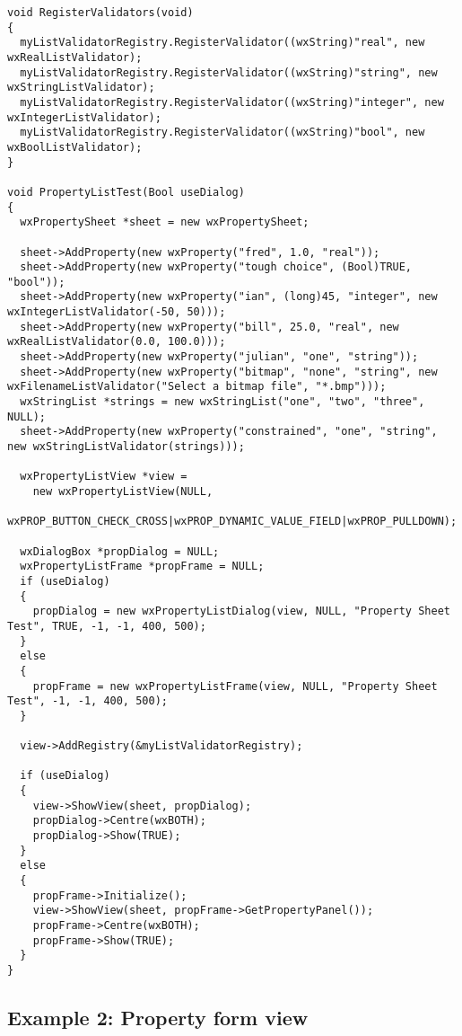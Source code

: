 \begin{verbatim}
void RegisterValidators(void)
{
  myListValidatorRegistry.RegisterValidator((wxString)"real", new wxRealListValidator);
  myListValidatorRegistry.RegisterValidator((wxString)"string", new wxStringListValidator);
  myListValidatorRegistry.RegisterValidator((wxString)"integer", new wxIntegerListValidator);
  myListValidatorRegistry.RegisterValidator((wxString)"bool", new wxBoolListValidator);
}

void PropertyListTest(Bool useDialog)
{
  wxPropertySheet *sheet = new wxPropertySheet;

  sheet->AddProperty(new wxProperty("fred", 1.0, "real"));
  sheet->AddProperty(new wxProperty("tough choice", (Bool)TRUE, "bool"));
  sheet->AddProperty(new wxProperty("ian", (long)45, "integer", new wxIntegerListValidator(-50, 50)));
  sheet->AddProperty(new wxProperty("bill", 25.0, "real", new wxRealListValidator(0.0, 100.0)));
  sheet->AddProperty(new wxProperty("julian", "one", "string"));
  sheet->AddProperty(new wxProperty("bitmap", "none", "string", new wxFilenameListValidator("Select a bitmap file", "*.bmp")));
  wxStringList *strings = new wxStringList("one", "two", "three", NULL);
  sheet->AddProperty(new wxProperty("constrained", "one", "string", new wxStringListValidator(strings)));

  wxPropertyListView *view =
    new wxPropertyListView(NULL,
     wxPROP_BUTTON_CHECK_CROSS|wxPROP_DYNAMIC_VALUE_FIELD|wxPROP_PULLDOWN);

  wxDialogBox *propDialog = NULL;
  wxPropertyListFrame *propFrame = NULL;
  if (useDialog)
  {
    propDialog = new wxPropertyListDialog(view, NULL, "Property Sheet Test", TRUE, -1, -1, 400, 500);
  }
  else
  {
    propFrame = new wxPropertyListFrame(view, NULL, "Property Sheet Test", -1, -1, 400, 500);
  }
  
  view->AddRegistry(&myListValidatorRegistry);

  if (useDialog)
  {
    view->ShowView(sheet, propDialog);
    propDialog->Centre(wxBOTH);
    propDialog->Show(TRUE);
  }
  else
  {
    propFrame->Initialize();
    view->ShowView(sheet, propFrame->GetPropertyPanel());
    propFrame->Centre(wxBOTH);
    propFrame->Show(TRUE);
  }
}
\end{verbatim}

\subsection{Example 2: Property form view}


